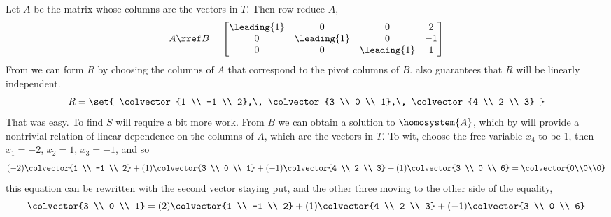 Let $A$ be the matrix whose columns are the vectors in $T$.  Then row-reduce $A$,
%
\begin{equation*}
A\rref B=
\begin{bmatrix}
 \leading{1} & 0 & 0 & 2 \\
 0 & \leading{1} & 0 & -1 \\
 0 & 0 & \leading{1} & 1
\end{bmatrix}
\end{equation*}
%
From  we can form $R$ by choosing the columns of $A$ that correspond to the pivot columns of $B$.   also guarantees that $R$ will be linearly independent.
%
\begin{equation*}
R=\set{
\colvector{1 \\ -1 \\ 2},\,
\colvector{3 \\ 0 \\ 1},\,
\colvector{4 \\ 2 \\ 3}
}
\end{equation*}
%
That was easy.  To find $S$ will require a bit more work.  From $B$ we can obtain a solution to $\homosystem{A}$, which by  will provide a nontrivial relation of linear dependence on the columns of $A$, which are the vectors in $T$.  To wit,  choose the free variable $x_4$ to be 1, then $x_1=-2$, $x_2=1$, $x_3=-1$, and so
%
\begin{equation*}
(-2)\colvector{1 \\ -1 \\ 2}+
(1)\colvector{3 \\ 0 \\ 1}+
(-1)\colvector{4 \\ 2 \\ 3}+
(1)\colvector{3 \\ 0 \\ 6}
=
\colvector{0\\0\\0}
\end{equation*}
%
this equation can be rewritten with the second vector staying put, and the other three moving to the other side of the equality,
%
\begin{equation*}
\colvector{3 \\ 0 \\ 1}
=
(2)\colvector{1 \\ -1 \\ 2}+
(1)\colvector{4 \\ 2 \\ 3}+
(-1)\colvector{3 \\ 0 \\ 6}
\end{equation*}
